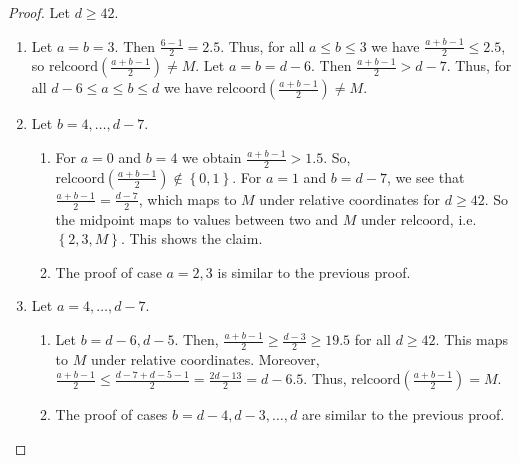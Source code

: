 \begin{proof}
    Let \( d \geq 42 \).
    \begin{enumerate}
        \item Let \( a = b = 3 \). Then \( \frac{6 - 1 }{2} = 2.5 \). Thus, for all \( a \leq b \leq 3 \) we have \( \frac{a + b - 1 }{2} \leq 2.5 \), so \(\mathrm{relcoord}( \frac{a + b - 1 }{2})  \neq M \). Let \( a = b = d - 6 \). Then \( \frac{a + b -1}{2} > d - 7 \). Thus, for all \( d-6 \leq a \leq b \leq d \) we have \( \mathrm{relcoord}(\frac{a + b - 1 }{2}) \neq M \).
        \item Let \( b = 4, \dots, d-7 \).
        \begin{enumerate}
            \item For \( a = 0 \) and \( b  = 4 \) we obtain \( \frac{a + b -1}{2} > 1.5 \). So, \( \mathrm{relcoord}(\frac{a + b - 1}{2})  \notin \left\{ 0,1 \right\} \). For \( a = 1 \) and \( b  = d-7 \), we see that \( \frac{a + b -1}{2} = \frac{d-7}{2} \), which maps to \( M \) under relative coordinates for \( d \geq 42 \). So the midpoint maps to values between two and \( M \) under \( \mathrm{relcoord} \), i.e. \( \left\{ 2,3,M \right\} \). This shows the claim.
            \item The proof of case \( a = 2,3 \) is similar to the previous proof.
        \end{enumerate}
        \item Let \( a = 4, \dots, d-7 \).
        \begin{enumerate}
            \item Let \( b = d-6, d-5 \). Then, \( \frac{a + b - 1}{2} \geq \frac{d - 3}{2} \geq 19.5 \) for all \( d \geq 42 \). This maps to \( M \) under relative coordinates. Moreover,  \( \frac{a + b - 1}{2} \leq \frac{d - 7 + d - 5 - 1}{2} = \frac{2d - 13}{2} = d - 6.5 \). Thus, 
            \( \mathrm{relcoord}(\frac{a + b - 1}{2}) = M \).
            \item The proof of cases \( b = d-4, d-3, \dots, d \) are similar to the previous proof.
        \end{enumerate}
    \end{enumerate}
\end{proof}



